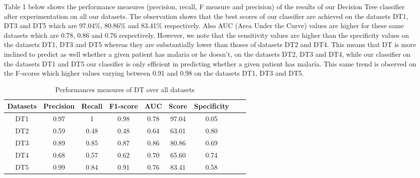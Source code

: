 Table 1  below shows the performance measures (precision, recall, F measure and precision) of the results of our Decision Tree classifier after experimentation on all our datasets. The observation shows that the best scores of our classifier are achieved on the datasets DT1, DT3 and DT5 which are 97.04\%, 80.86\% and 83.41\% respectively. Also AUC (Area Under the Curve) values are higher for these same datasets which are 0.78, 0.86 and 0.76 respectively. However, we note that the sensitivity values are higher than the specificity values on the datasets DT1, DT3  and DT5 whereas they are substantially lower than thoses of datasets DT2 and DT4. This means that DT is more inclined to predict as well whether a given patient has malaria or he doesn’t, on the datasets DT2, DT3 and DT4, while our classifier on the datasets DT1 and DT5 our classifier is only efficient in predicting whether a given patient has malaria. This same trend is observed on the F-scores which higher values varying between 0.91 and 0.98 on the datasets DT1, DT3 and DT5.

\begin{table}[!ht]
\centering
\begin{tabular}{*{7}{c}l r}
  \toprule
  \textbf{Datasets} & \textbf{Precision} & \textbf{Recall} & \textbf{F1-score}&\textbf{AUC} &\textbf{Score}&\textbf{Specificity}\\
   \midrule
  DT1 &0.97  & 1   & 0.98 & 0.78 & 97.04 & 0.05 \\
  DT2 & 0.59 &0.48 &0.48  &0.64  &63.01  &0.80\\
  DT3 &0.89  &0.85 &0.87  &0.86  &80.86  &0.69\\
  DT4 &0.68  &0.57 &0.62  &0.70  &65.60  &0.74\\
  DT5 &0.99  &0.84 &0.91  &0.76  &83.41  &0.58\\

  
    \bottomrule
\end{tabular}
\caption{Performances measures of DT over all datasets}\label{perf-measure-dt1}
\end{table}
